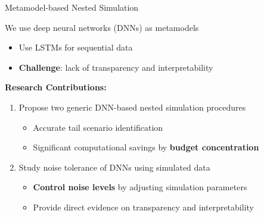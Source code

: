 \documentclass[9pt,handout]{beamer}
\begin{document}
\begin{frame}{Metamodel-based Nested Simulation}

    We use deep neural networks (DNNs) as metamodels 
    \begin{itemize}
        \item Use LSTMs for sequential data
        \item \textbf{Challenge}: lack of transparency and interpretability
    \end{itemize}

    \vspace{20pt}

    \textbf{Research Contributions:}
    \vspace{6pt}
    \begin{enumerate}
        \item Propose two generic DNN-based nested simulation procedures
        \begin{itemize}
            \item   Accurate tail scenario identification
            \item   Significant computational savings by \textbf{budget concentration}
        \end{itemize}
        \vspace{6pt}
        \item Study noise tolerance of DNNs using simulated data
        \begin{itemize}
            \item \textbf{Control noise levels} by adjusting simulation parameters
            \item Provide direct evidence on transparency and interpretability
        \end{itemize}
    \end{enumerate}

\end{frame}
\end{document}
